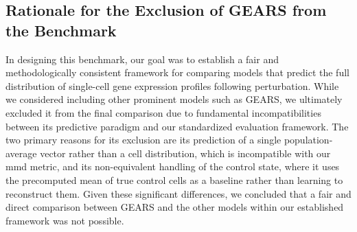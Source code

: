\subsection{Rationale for the Exclusion of GEARS from the Benchmark}
\label{app:metrics:gears_exclusion}

In designing this benchmark, our goal was to establish a fair and methodologically consistent framework for comparing models that predict the full distribution of single-cell gene expression profiles following perturbation.
While we considered including other prominent models such as GEARS, we ultimately excluded it from the final comparison due to fundamental incompatibilities between its predictive paradigm and our standardized evaluation framework.
The two primary reasons for its exclusion are its prediction of a single population-average vector rather than a cell distribution, which is incompatible with our \gls{mmd} metric, and its non-equivalent handling of the control state, where it uses the precomputed mean of true control cells as a baseline rather than learning to reconstruct them.
Given these significant differences, we concluded that a fair and direct comparison between GEARS and the other models within our established framework was not possible.


